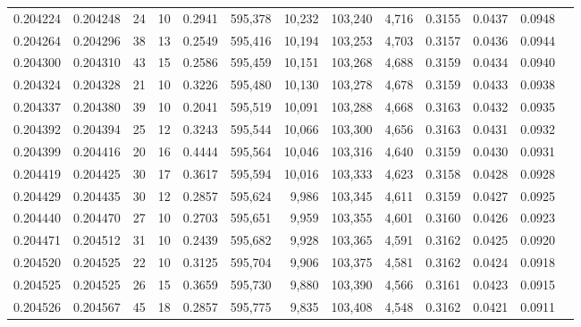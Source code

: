 \begin{tabular}{rrrrrrrrrrrrr}
0.204224 & 0.204248 &    24 &  10 &                                     0.2941 & 595,378 &  10,232 & 103,240 &   4,716 & 0.3155 & 0.0437 & 0.0948 \\
0.204264 & 0.204296 &    38 &  13 &                                     0.2549 & 595,416 &  10,194 & 103,253 &   4,703 & 0.3157 & 0.0436 & 0.0944 \\
0.204300 & 0.204310 &    43 &  15 &                                     0.2586 & 595,459 &  10,151 & 103,268 &   4,688 & 0.3159 & 0.0434 & 0.0940 \\
0.204324 & 0.204328 &    21 &  10 &                                     0.3226 & 595,480 &  10,130 & 103,278 &   4,678 & 0.3159 & 0.0433 & 0.0938 \\
0.204337 & 0.204380 &    39 &  10 &                                     0.2041 & 595,519 &  10,091 & 103,288 &   4,668 & 0.3163 & 0.0432 & 0.0935 \\
0.204392 & 0.204394 &    25 &  12 &                                     0.3243 & 595,544 &  10,066 & 103,300 &   4,656 & 0.3163 & 0.0431 & 0.0932 \\
0.204399 & 0.204416 &    20 &  16 &                                     0.4444 & 595,564 &  10,046 & 103,316 &   4,640 & 0.3159 & 0.0430 & 0.0931 \\
0.204419 & 0.204425 &    30 &  17 &                                     0.3617 & 595,594 &  10,016 & 103,333 &   4,623 & 0.3158 & 0.0428 & 0.0928 \\
0.204429 & 0.204435 &    30 &  12 &                                     0.2857 & 595,624 &   9,986 & 103,345 &   4,611 & 0.3159 & 0.0427 & 0.0925 \\
0.204440 & 0.204470 &    27 &  10 &                                     0.2703 & 595,651 &   9,959 & 103,355 &   4,601 & 0.3160 & 0.0426 & 0.0923 \\
0.204471 & 0.204512 &    31 &  10 &                                     0.2439 & 595,682 &   9,928 & 103,365 &   4,591 & 0.3162 & 0.0425 & 0.0920 \\
0.204520 & 0.204525 &    22 &  10 &                                     0.3125 & 595,704 &   9,906 & 103,375 &   4,581 & 0.3162 & 0.0424 & 0.0918 \\
0.204525 & 0.204525 &    26 &  15 &                                     0.3659 & 595,730 &   9,880 & 103,390 &   4,566 & 0.3161 & 0.0423 & 0.0915 \\
0.204526 & 0.204567 &    45 &  18 &                                     0.2857 & 595,775 &   9,835 & 103,408 &   4,548 & 0.3162 & 0.0421 & 0.0911 \\

\end{tabular}
